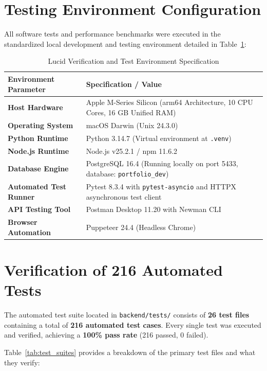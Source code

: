 \section{Testing Environment Configuration}
All software tests and performance benchmarks were executed in the standardized local development and testing environment detailed in Table~\ref{tab:test_env}:

\begin{table}[H]
\centering
\caption{Lucid Verification and Test Environment Specification}
\label{tab:test_env}
\begin{tabularx}{\textwidth}{>{\RaggedRight\arraybackslash\bfseries}p{5.2cm} >{\RaggedRight\arraybackslash}X}
\toprule
\textnormal{\textbf{Environment Parameter}} & \textbf{Specification / Value} \\
\midrule
Host Hardware & Apple M-Series Silicon (arm64 Architecture, 10 CPU Cores, 16 GB Unified RAM) \\
Operating System & macOS Darwin (Unix 24.3.0) \\
Python Runtime & Python 3.14.7 (Virtual environment at \texttt{.venv}) \\
Node.js Runtime & Node.js v25.2.1 / npm 11.6.2 \\
Database Engine & PostgreSQL 16.4 (Running locally on port 5433, database: \texttt{portfolio\_dev}) \\
Automated Test Runner & Pytest 8.3.4 with \texttt{pytest-asyncio} and HTTPX asynchronous test client \\
API Testing Tool & Postman Desktop 11.20 with Newman CLI \\
Browser Automation & Puppeteer 24.4 (Headless Chrome) \\
\bottomrule
\end{tabularx}
\end{table}

\section{Verification of 216 Automated Tests}
The automated test suite located in \texttt{backend/tests/} consists of \textbf{26 test files} containing a total of \textbf{216 automated test cases}. Every single test was executed and verified, achieving a \textbf{100\% pass rate} (216 passed, 0 failed).

Table~\ref{tab:test_suites} provides a breakdown of the primary test files and what they verify:


